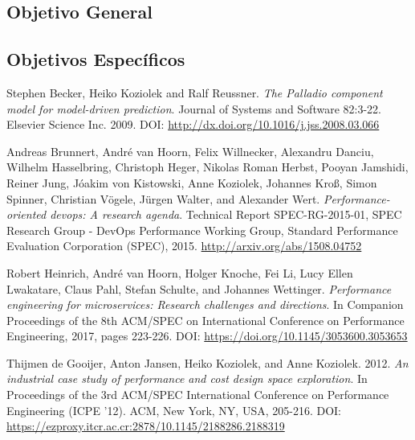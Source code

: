 \subsection{Objetivo General}

\subsection{Objetivos Específicos}





\begin{thebibliography}{9}

 Stephen Becker, Heiko Koziolek and Ralf Reussner. \emph{The Palladio component model for model-driven prediction}. Journal of Systems and Software 82:3-22. Elsevier Science Inc. 2009. DOI: \url{http://dx.doi.org/10.1016/j.jss.2008.03.066}

 Andreas Brunnert, André van Hoorn, Felix Willnecker, Alexandru Danciu, Wilhelm Hasselbring, Christoph Heger, Nikolas Roman Herbst, Pooyan Jamshidi, Reiner Jung, Jóakim von Kistowski, Anne Koziolek, Johannes Kroß, Simon Spinner, Christian Vögele, Jürgen Walter, and Alexander Wert. \emph{Performance-oriented devops: A research agenda}. Technical Report SPEC-RG-2015-01, SPEC Research Group - DevOps Performance Working Group, Standard Performance Evaluation Corporation (SPEC), 2015. \url{http://arxiv.org/abs/1508.04752}

 Robert Heinrich, André van Hoorn, Holger Knoche, Fei Li, Lucy Ellen Lwakatare, Claus Pahl, Stefan Schulte, and Johannes Wettinger. \emph{Performance engineering for microservices: Research challenges and directions}. In Companion Proceedings of the 8th ACM/SPEC on International Conference on Performance Engineering, 2017, pages 223-226. DOI: \url{https://doi.org/10.1145/3053600.3053653}

 Thijmen de Gooijer, Anton Jansen, Heiko Koziolek, and Anne Koziolek. 2012. \emph{An industrial case study of performance and cost design space exploration}. In Proceedings of the 3rd ACM/SPEC International Conference on Performance Engineering (ICPE '12). ACM, New York, NY, USA, 205-216. DOI: \url{https://ezproxy.itcr.ac.cr:2878/10.1145/2188286.2188319}

\end{thebibliography}

\appendix
\section{}


